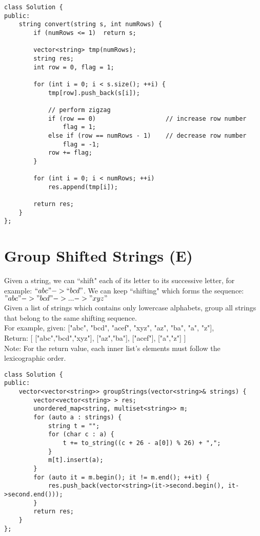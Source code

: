 \begin{lstlisting}
class Solution {
public:
    string convert(string s, int numRows) {
        if (numRows <= 1)  return s;
        
        vector<string> tmp(numRows);
        string res;
        int row = 0, flag = 1;
        
        for (int i = 0; i < s.size(); ++i) {
            tmp[row].push_back(s[i]);
            
            // perform zigzag
            if (row == 0)                   // increase row number
                flag = 1;
            else if (row == numRows - 1)    // decrease row number
                flag = -1;
            row += flag;
        }
        
        for (int i = 0; i < numRows; ++i)
            res.append(tmp[i]);
            
        return res;
    }
};
\end{lstlisting}


\section{Group Shifted Strings (E)}
Given a string, we can ``shift" each of its letter to its successive letter, for example: $``abc" -> ``bcd"$. We can keep ``shifting" which forms the sequence: $"abc" -> "bcd" -> ... -> "xyz"$\\

Given a list of strings which contains only lowercase alphabets, group all strings that belong to the same shifting sequence.\\
For example, given: ["abc", "bcd", "acef", "xyz", "az", "ba", "a", "z"], \\
Return:
[
  ["abc","bcd","xyz"],
  ["az","ba"],
  ["acef"],
  ["a","z"]
] \\

Note: For the return value, each inner list's elements must follow the lexicographic order.\\

\begin{lstlisting}
class Solution {
public:
    vector<vector<string>> groupStrings(vector<string>& strings) {
        vector<vector<string> > res;
        unordered_map<string, multiset<string>> m;
        for (auto a : strings) {
            string t = "";
            for (char c : a) {
                t += to_string((c + 26 - a[0]) % 26) + ",";
            }
            m[t].insert(a);
        }
        for (auto it = m.begin(); it != m.end(); ++it) {
            res.push_back(vector<string>(it->second.begin(), it->second.end()));
        }
        return res;
    }
};
\end{lstlisting}


